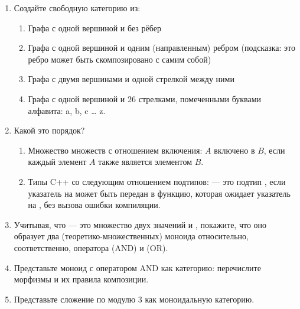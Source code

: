 \begin{enumerate}
  \tightlist
  \item
        Создайте свободную категорию из:

        \begin{enumerate}
          \tightlist
          \item
                Графа с одной вершиной и без рёбер
          \item
                Графа с одной вершиной и одним (направленным) ребром (подсказка: это ребро может
                быть скомпозировано с самим собой)
          \item
                Графа с двумя вершинами и одной стрелкой между ними
          \item
                Графа с одной вершиной и 26 стрелками, помеченными буквами
                алфавита: a, b, c \ldots{} z.
        \end{enumerate}
  \item
        Какой это порядок?

        \begin{enumerate}
          \tightlist
          \item
                Множество множеств с отношением включения: $A$ включено в $B$, если
                каждый элемент $A$ также является элементом $B$.
          \item
                Типы C++ со следующим отношением подтипов:  --- это подтип
                , если указатель на  может быть передан в функцию, которая ожидает
                указатель на , без вызова ошибки компиляции.
        \end{enumerate}
  \item
        Учитывая, что  --- это множество двух значений  и , покажите, что
        оно образует два (теоретико-множественных) моноида относительно, соответственно,
        оператора \code{\&\&} (AND) и \code{||} (OR).
  \item
        Представьте моноид  с оператором AND как категорию: перечислите
        морфизмы и их правила композиции.
  \item
        Представьте сложение по модулю 3 как моноидальную категорию.
\end{enumerate}
